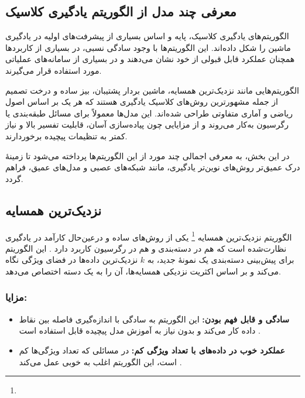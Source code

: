 \subsection{معرفی چند مدل از الگوریتم یادگیری کلاسیک}

الگوریتم‌های یادگیری کلاسیک، پایه و اساس بسیاری از پیشرفت‌های اولیه در یادگیری ماشین را شکل داده‌اند. این الگوریتم‌ها با وجود سادگی نسبی، در بسیاری از کاربردها همچنان عملکرد قابل قبولی از خود نشان می‌دهند و در بسیاری از سامانه‌های عملیاتی مورد استفاده قرار می‌گیرند.

الگوریتم‌هایی مانند نزدیک‌ترین همسایه، ماشین بردار پشتیبان، بیز ساده و درخت تصمیم از جمله مشهورترین روش‌های کلاسیک یادگیری هستند که هر یک بر اساس اصول ریاضی و آماری متفاوتی طراحی شده‌اند. این مدل‌ها معمولاً برای مسائل طبقه‌بندی یا رگرسیون به‌کار می‌روند و از مزایایی چون پیاده‌سازی آسان، قابلیت تفسیر بالا و نیاز کمتر به تنظیمات پیچیده برخوردارند.

در این بخش، به معرفی اجمالی چند مورد از این الگوریتم‌ها پرداخته می‌شود تا زمینهٔ درک عمیق‌تر روش‌های نوین‌تر یادگیری، مانند شبکه‌های عصبی و مدل‌های عمیق، فراهم گردد.

\subsection{نزدیک‌ترین همسایه }

الگوریتم نزدیک‌ترین همسایه \footnote{} یکی از روش‌های ساده و درعین‌حال کارآمد در یادگیری نظارت‌شده است که هم در دسته‌بندی و هم در رگرسیون کاربرد دارد
\cite{cover1967nearest,duda1973pattern,mitchell1997machine}.
این الگوریتم برای پیش‌بینی دسته‌بندی یک نمونهٔ جدید، به $k$ نزدیک‌ترین داده‌ها در فضای ویژگی نگاه می‌کند و بر اساس اکثریت نزدیکی همسایه‌ها، آن را به یک دسته اختصاص می‌دهد. 

\subsubsection{مزایا:}
\begin{itemize}
	\item \textbf{سادگی و قابل فهم بودن:}  
	این الگوریتم به سادگی با اندازه‌گیری فاصله بین نقاط داده کار می‌کند و بدون نیاز به آموزش مدل پیچیده قابل استفاده است
	\cite{cover1967nearest}.
	\item \textbf{عملکرد خوب در داده‌های با تعداد ویژگی کم:}  
	در مسائلی که تعداد ویژگی‌ها کم است، این الگوریتم اغلب به خوبی عمل می‌کند
	\cite{james2013introduction}.
\end{itemize}


